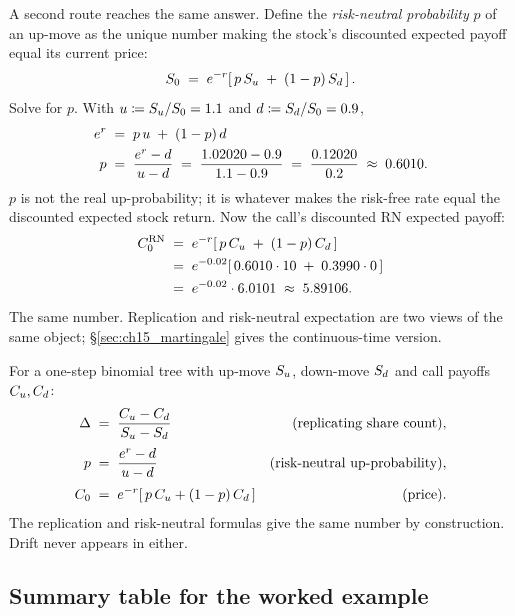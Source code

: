 A second route reaches the same answer. Define the
\emph{risk-neutral probability} $p$ of an up-move as the unique
number making the stock's discounted expected payoff equal its
current price:
\begin{equation}
  S_0 \;=\; e^{-r}\!\left[\,p\,S_u \;+\; (1-p)\,S_d\,\right].
  \label{eq:bin_rn_def}
\end{equation}
Solve for $p$. With $u \coloneqq S_u/S_0 = 1.1$ and
$d \coloneqq S_d/S_0 = 0.9$,
\begin{align}
  e^{r} \;&=\; p\,u \;+\; (1-p)\,d \nonumber \\
  p \;&=\; \frac{e^{r} - d}{u - d}
       \;=\; \frac{1.02020 - 0.9}{1.1 - 0.9}
       \;=\; \frac{0.12020}{0.2}
       \;\approx\; 0.6010.
  \label{eq:bin_p}
\end{align}
$p$ is not the real up-probability; it is whatever makes the
risk-free rate equal the discounted expected stock return. Now
the call's discounted RN expected payoff:
\begin{align}
  C_0^{\text{RN}}
  \;&=\; e^{-r}\!\left[\,p\,C_u \;+\; (1-p)\,C_d\,\right]
  \nonumber \\
  \;&=\; e^{-0.02}\!\left[\,0.6010 \cdot 10 \;+\; 0.3990 \cdot 0\,\right]
  \nonumber \\
  \;&=\; e^{-0.02} \cdot 6.0101
  \;\approx\; 5.89106. \label{eq:bin_C0_rn}
\end{align}
The same number. Replication and risk-neutral expectation are
two views of the same object; \S\ref{sec:ch15_martingale} gives
the continuous-time version.

\begin{keyfactbox}
For a one-step binomial tree with up-move $S_u$, down-move
$S_d$ and call payoffs $C_u, C_d$:
\begin{align*}
  \Delta \;&=\; \frac{C_u - C_d}{S_u - S_d}
  &\text{(replicating share count)}, \\[0.25em]
  p \;&=\; \frac{e^{r} - d}{u - d}
  &\text{(risk-neutral up-probability)}, \\[0.25em]
  C_0 \;&=\; e^{-r}\!\left[\,p\,C_u + (1-p)\,C_d\,\right]
  &\text{(price)}.
\end{align*}
The replication and risk-neutral formulas give the same number
by construction. Drift never appears in either.
\end{keyfactbox}

\subsection{Summary table for the worked example}
\label{subsec:ch15_binomial_summary}

